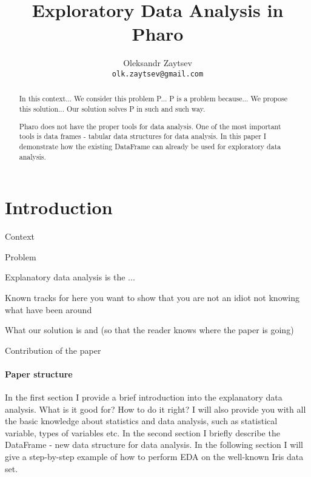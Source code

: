 \documentclass{article}
\title{Exploratory Data Analysis in Pharo}
\author{
  Oleksandr Zaytsev\\
  \texttt{olk.zaytsev@gmail.com}
}
\date{}
\begin{document}
\maketitle


\begin{abstract}
In this context...
We consider this problem P...
P is a problem because...
We propose this solution...
Our solution solves P in such and such way.

Pharo does not have the proper tools for data analysis. One of the most important tools is data frames - tabular data structures for data analysis. In this paper I demonstrate how the existing DataFrame can already be used for exploratory data analysis.
\end{abstract}


\section{Introduction}
\label{sec:intro}

Context

Problem

Explanatory data analysis is the ...

Known tracks for 
	here you want to show that you are not an idiot not knowing what have been around

What our solution is  and  (so that the reader knows where the paper is going)

Contribution of the paper

\paragraph{Paper structure} In the first section I provide a brief introduction into the explanatory data analysis. What is it good for? How to do it right? I will also provide you with all the basic knowledge about statistics and data analysis, such as statistical variable, types of variables etc. In the second section I briefly describe the DataFrame - new data structure for data analysis. In the following section I will give a step-by-step example of how to perform EDA on the well-known Iris data set.
\end{document}
